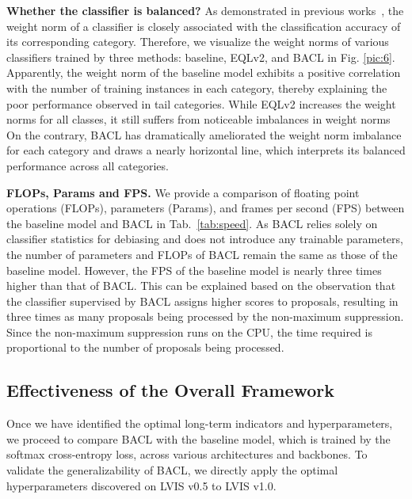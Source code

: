 \documentclass[lettersize,journal]{IEEEtran}
\begin{document}
\noindent\textbf{Whether the classifier is balanced?}
As demonstrated in previous works~\cite{li2020overcoming}, the weight norm of a classifier is closely associated with the classification accuracy of its corresponding category.
Therefore, we visualize the weight norms of various classifiers trained by three methods: baseline, EQLv2, and BACL in Fig. \ref{pic:6}.
Apparently, the weight norm of the baseline model exhibits a positive correlation with the number of training instances in each category, thereby explaining the poor performance observed in tail categories.
While EQLv2 increases the weight norms for all classes, it still suffers from noticeable imbalances in weight norms
On the contrary, BACL has dramatically ameliorated the weight norm imbalance for each category and draws a nearly horizontal line, which interprets its balanced performance across all categories.

\noindent\textbf{FLOPs, Params and FPS.} We provide a comparison of floating point operations (FLOPs), parameters (Params), and frames per second (FPS) between the baseline model and BACL in Tab.~\ref{tab:speed}.
As BACL relies solely on classifier statistics for debiasing and does not introduce any trainable parameters, the number of parameters and FLOPs of BACL remain the same as those of the baseline model.
However, the FPS of the baseline model is nearly three times higher than that of BACL.
This can be explained based on the observation that the classifier supervised by BACL assigns higher scores to proposals, resulting in three times as many proposals being processed by the non-maximum suppression.
Since the non-maximum suppression runs on the CPU, the time required is proportional to the number of proposals being processed.



\subsection{Effectiveness of the Overall Framework}
Once we have identified the optimal long-term indicators and hyperparameters, we proceed to compare BACL with the baseline model, which is trained by the softmax cross-entropy loss, across various architectures and backbones. To validate the generalizability of BACL, we directly apply the optimal hyperparameters discovered on LVIS v0.5 to LVIS v1.0.
\end{document}
